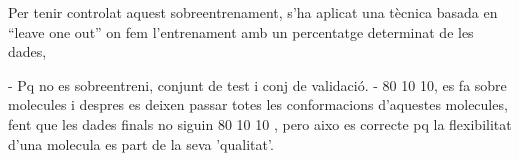 \documentclass[titlepage,a4paper,12pt]{book}
\begin{document}
Per tenir controlat aquest sobreentrenament, s'ha aplicat una tècnica basada en
``leave one out'' on fem l'entrenament amb un percentatge determinat de les
dades, 

- Pq no es sobreentreni, conjunt de test i conj de validació.
- 80 10 10, es fa sobre molecules i despres es deixen passar totes les
conformacions d'aquestes molecules, fent que les dades finals no siguin 80 10 10
, pero aixo es correcte pq la flexibilitat d'una molecula es part de la seva
'qualitat'.


\end{document}
